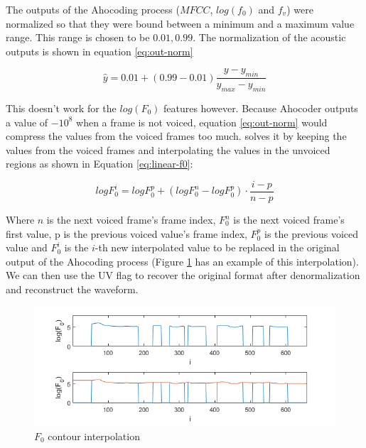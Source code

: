 The outputs of the Ahocoding process ($MFCC$, $log(f_0)$ and $f_v$) were normalized so that they were bound between a minimum and a maximum value range. This range is chosen to be ${0.01, 0.99}$. The normalization of the acoustic outputs is shown in equation \ref{eq:out-norm}

\begin{equation}
    \hat{y} = 0.01 + (0.99 - 0.01) \frac{y - y_{min}}{y_{max} - y_{min}}
    \label{eq:out-norm}
\end{equation}

This doesn't work for the $log(F_0)$ features however. Because Ahocoder outputs a value of $-10^8$ when a frame is not voiced, equation \eqref{eq:out-norm} would compress the values from the voiced frames too much. \cite{pascual2016deep} solves it by keeping the values from the voiced frames and interpolating the values in the unvoiced regions as shown in Equation \ref{eq:linear-f0}:

\begin{equation}
    log F_0^i = log F_0^p + (log F_0^n - log F_0^p) \cdot \frac{i-p}{n-p}
    \label{eq:linear-f0}
\end{equation}

Where $n$ is the next voiced frame's frame index, $F_0^n$ is the next voiced frame's first value, p is the previous voiced value's frame index, $F_0^p$ is the previous voiced value and $F_0^i$ is the $i$-th new interpolated value to be replaced in the original output of the Ahocoding process (Figure \ref{fig:f0-int} has an example of this interpolation). We can then use the UV flag to recover the original format after denormalization and reconstruct the waveform.

\begin{figure}[h]
    \centering
    \includegraphics[width=12cm]{figures/f0.png}
    \caption{$F_0$ contour interpolation}
    \label{fig:f0-int}
\end{figure}


